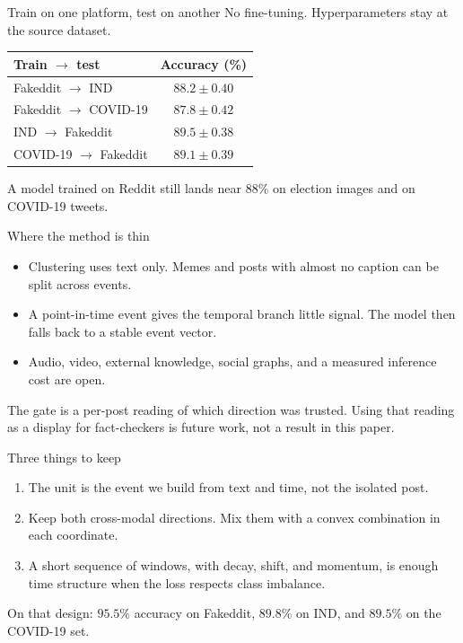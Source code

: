 \begin{frame}{Train on one platform, test on another}
  No fine-tuning. Hyperparameters stay at the source dataset.
  \vspace{0.6em}
  \begin{center}
    \renewcommand{\arraystretch}{1.2}
    \begin{tabular}{lc}
      \toprule
      Train $\to$ test & Accuracy (\%) \\
      \midrule
      Fakeddit $\to$ IND & $88.2\pm 0.40$ \\
      Fakeddit $\to$ COVID-19 & $87.8\pm 0.42$ \\
      IND $\to$ Fakeddit & $89.5\pm 0.38$ \\
      COVID-19 $\to$ Fakeddit & $89.1\pm 0.39$ \\
      \bottomrule
    \end{tabular}
  \end{center}
  \vspace{0.7em}
  A model trained on Reddit still lands near $88\%$ on election images and on COVID-19 tweets.
\end{frame}

\begin{frame}{Where the method is thin}
  \begin{itemize}
    \item Clustering uses text only. Memes and posts with almost no caption can be split across events.
    \item A point-in-time event gives the temporal branch little signal. The model then falls back to a stable event vector.
    \item Audio, video, external knowledge, social graphs, and a measured inference cost are open.
  \end{itemize}
  \vspace{0.6em}
  The gate is a per-post reading of which direction was trusted. Using that reading as a display for fact-checkers is future work, not a result in this paper.
\end{frame}

\begin{frame}{Three things to keep}
  \begin{enumerate}
    \item The unit is the event we build from text and time, not the isolated post.
    \item Keep both cross-modal directions. Mix them with a convex combination in each coordinate.
    \item A short sequence of windows, with decay, shift, and momentum, is enough time structure when the loss respects class imbalance.
  \end{enumerate}
  \vspace{0.8em}
  On that design: $95.5\%$ accuracy on Fakeddit, $89.8\%$ on IND, and $89.5\%$ on the COVID-19 set.
\end{frame}

